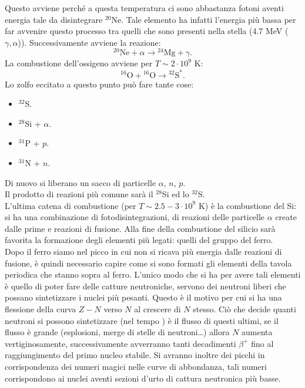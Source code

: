 Questo avviene perché a questa temperatura ci sono abbastanza fotoni aventi energia tale da disintegrare ${}^{20}$Ne. Tale elemento ha infatti l'energia più bassa per far avvenire questo processo tra quelli che sono presenti nella stella (4.7 MeV ($\gamma,\alpha$)). Successivamente avviene la reazione:
\[
    {}^{20}\text{Ne} + \alpha  \to {}^{24}\text{Mg} + \gamma
.\] 
La combustione dell'ossigeno avviene per $T\sim 2\cdot 10^9$  K:
\[
    {}^{16}\text{O}+ {}^{16}\text{O} \to {}^{32}\text{S}^*
.\] 
Lo zolfo eccitato a questo punto può fare tante cose:
\begin{itemize}
    \item ${}^{32}$S.
    \item ${}^{28}$Si + $\alpha$.
    \item ${}^{31}$P + $p$.
    \item ${}^{31}$N + $n$.
\end{itemize}
Di nuovo si liberano un sacco di particelle $\alpha$, $n$, $p$. \\
Il prodotto di reazioni più comune sarà il ${}^{28}$Si ed lo ${}^{32}$S. \\
L'ultima catena di combustione (per $T\sim 2.5-3 \cdot 10^9$ K) è la combustione del Si: si ha una combinazione di fotodisintegrazioni, di reazioni delle particelle $\alpha$ create dalle prime e reazioni di fusione. Alla fine della combustione del silicio sarà favorita la formazione degli elementi più legati: quelli del gruppo del ferro. \\
Dopo il ferro siamo nel picco in cui non si ricava più energia dalle reazioni di fusione, è quindi necessario capire come si sono formati gli elementi della tavola periodica che stanno sopra al ferro. L'unico modo che si ha per avere tali elementi è quello di poter fare delle catture neutroniche, servono dei neutroni liberi che possano sintetizzare i nuclei più pesanti. Questo è il motivo per cui si ha una flessione della curva $Z-N$ verso $N$ al crescere di $N$ stesso. Ciò che decide quanti neutroni si possono sintetizzare (nel tempo ) è il flusso di questi ultimi, se il flusso è grande (esplosioni, merge di stelle di neutroni\ldots) allora $N$ aumenta vertiginosamente, successivamente avverranno tanti decadimenti $\beta^+$ fino al raggiungimento del primo nucleo stabile. Si avranno inoltre dei picchi in corrispondenza dei numeri magici nelle curve di abbondanza, tali numeri corrispondono ai nuclei aventi sezioni d'urto di cattura neutronica più basse.
